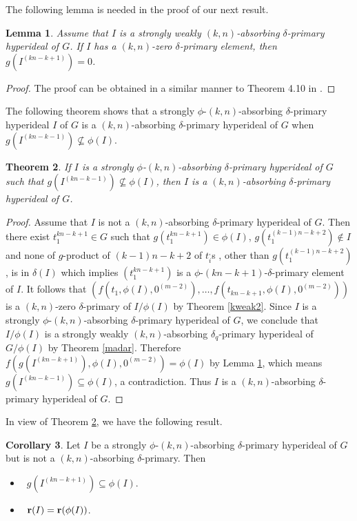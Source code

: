 \documentclass[preprint,review,10pt]{amsart}
\newtheorem{theorem}{Theorem}[section]
\newtheorem{lemma}[theorem]{Lemma}
\theoremstyle{definition}
\newtheorem{corollary}[theorem]{Corollary}
\theoremstyle{remark}
\numberwithin{equation}{section}
\begin{document}
The following lemma is needed in the proof of our next result.
\begin{lemma} \label{tangsiri}
Assume that $I$ is a strongly weakly $(k,n)$-absorbing $\delta$-primary hyperideal of $G$. If $I$ has a $(k,n)$-zero $\delta$-primary element, then $g(I^{(kn-k+1)})=0$.
\end{lemma}
\begin{proof}
The proof can be  obtained in a similar manner to Theorem 4.10 in \cite{weak}.
\end{proof}
The following theorem shows that a strongly $\phi$-$(k,n)$-absorbing $\delta$-primary hyperideal $I$ of $G$  is  a $(k,n)$-absorbing $\delta$-primary hyperideal of $G$ when $g(I^{(kn-k-1)}) \nsubseteq \phi(I)$.
\begin{theorem} \label{madar3}
 If $I$ is a strongly $\phi$-$(k,n)$-absorbing $\delta$-primary hyperideal of $G$ such that $g(I^{(kn-k-1)}) \nsubseteq \phi(I)$, then $I$ is  a $(k,n)$-absorbing $\delta$-primary hyperideal of $G$.
\end{theorem}
\begin{proof}
Assume that $I$ is  not  a $(k,n)$-absorbing $\delta$-primary hyperideal of $G$. Then there exist $t_1^{kn-k+1} \in G$ such that $g(t_1^{kn-k+1}) \in \phi(I)$, $g(t_1^{(k-1)n-k+2}) \notin I$ and none of $g$-product of $(k-1)n-k+2$ of $t_i^,$s , other than $g(t_1^{(k-1)n-k+2})$, is in $\delta(I)$ which implies $(t_1^{kn-k+1})$ is  a $\phi$-$(kn-k+1)$-$\delta$-primary element of $I$. It follows that  $(f(t_1,\phi(I),0^{(m-2)}),\ldots,f(t_{kn-k+1},\phi(I),0^{(m-2)}))$ is a $(k,n)$-zero $\delta$-primary of $I/\phi(I)$ by Theorem \ref{kweak2}. Since $I$ is a strongly $\phi$-$(k,n)$-absorbing $\delta$-primary hyperideal of $G$, we conclude that $I/\phi(I)$ is a   strongly weakly $(k,n)$-absorbing $\delta_q$-primary hyperideal of $G/\phi(I)$ by Theorem \ref{madar}. Therefore  $f(g(I^{(kn-k+1)}),\phi(I),0^{(m-2)})=\phi(I)$ by Lemma \ref{tangsiri}, which means $g(I^{(kn-k-1)}) \subseteq \phi(I)$, a contradiction. Thus $I$ is  a $(k,n)$-absorbing $\delta$-primary hyperideal of $G$.
\end{proof}
In view of Theorem \ref{madar3}, we have the following result.
\begin{corollary} \label{weak5}
Let $I$ be a strongly $\phi$-$(k,n)$-absorbing $\delta$-primary hyperideal of $G$ but is not a $(k,n)$-absorbing $\delta$-primary. Then 
\begin{itemize} 
\item[\rm(i)]~$g(I^{(kn-k+1)}) \subseteq \phi(I)$.
\item[\rm(ii)]~${\bf r}(I)={\bf r}(\phi(I))$.
\end{itemize} 
\end{corollary}
\end{document}
